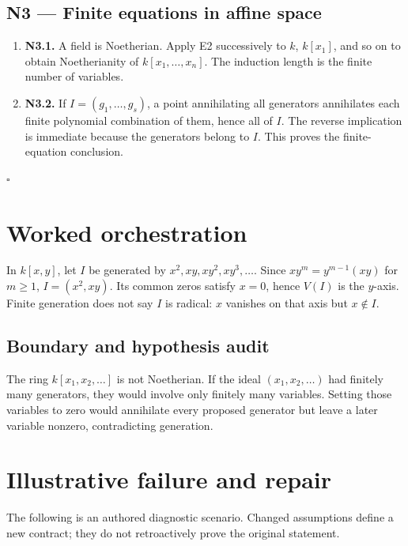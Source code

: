 \documentclass[preprint,12pt,aps,pra,showkeys,amsmath,amssymb,superscriptaddress,floatfix]{revtex4-2}
\theoremstyle{definition}
\theoremstyle{remark}
\begin{document}
\subsection{N3 --- Finite equations in affine
space}\label{n3-finite-equations-in-affine-space}

\begin{enumerate}
\def\labelenumi{\arabic{enumi}.}
\item
  \textbf{N3.1.} A field is Noetherian. Apply E2 successively to \(k\),
  \(k[x_1]\), and so on to obtain Noetherianity of
  \(k[x_1,\ldots,x_n]\). The induction length is the finite number of
  variables.
\item
  \textbf{N3.2.} If \(I=(g_1,\ldots,g_s)\), a point annihilating all
  generators annihilates each finite polynomial combination of them,
  hence all of \(I\). The reverse implication is immediate because the
  generators belong to \(I\). This proves the finite-equation
  conclusion.
\end{enumerate}

\hfill$\square$

\section{Worked orchestration}

In \(k[x,y]\), let \(I\) be generated by \(x^2,xy,xy^2,xy^3,\ldots\).
Since \(xy^m=y^{m-1}(xy)\) for \(m\ge1\), \(I=(x^2,xy)\). Its common
zeros satisfy \(x=0\), hence \(V(I)\) is the \(y\)-axis. Finite
generation does not say \(I\) is radical: \(x\) vanishes on that axis
but \(x\notin I\).

\subsection{Boundary and hypothesis audit}

The ring \(k[x_1,x_2,\ldots]\) is not Noetherian. If the ideal
\((x_1,x_2,\ldots)\) had finitely many generators, they would involve
only finitely many variables. Setting those variables to zero would
annihilate every proposed generator but leave a later variable nonzero,
contradicting generation.

\section{Illustrative failure and repair}

The following is an authored diagnostic scenario. Changed assumptions
define a new contract; they do not retroactively prove the original
statement.
\end{document}
